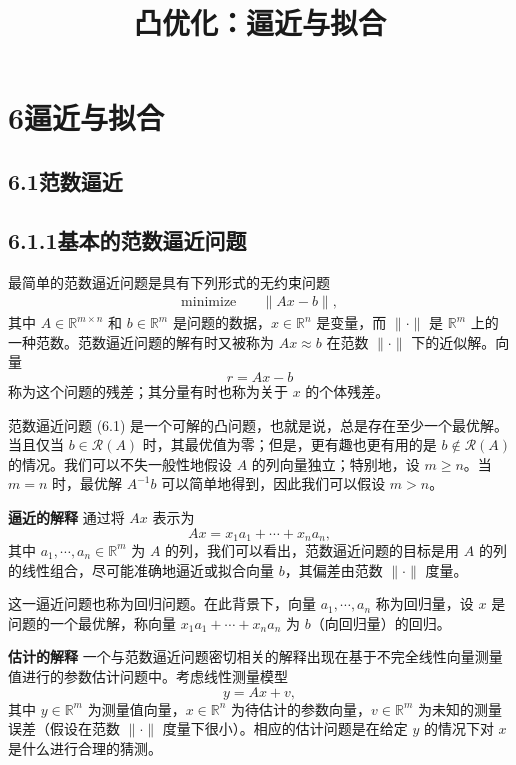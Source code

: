 \documentclass[UTF8, 12pt, fontset=fandol, oneside]{ctexart}
\title{凸优化：逼近与拟合}
\author{}
\date{}
\begin{document}
\maketitle

\section*{6\quad 逼近与拟合}

\subsection*{6.1\quad 范数逼近}

\subsection*{6.1.1\quad 基本的范数逼近问题}

最简单的范数逼近问题是具有下列形式的无约束问题
\begin{equation}
\begin{aligned}
\text{minimize}\quad & \|Ax-b\|,
\end{aligned}
\tag{6.1}
\end{equation}
其中 $A\in\mathbb{R}^{m\times n}$ 和 $b\in\mathbb{R}^m$ 是问题的数据，$x\in\mathbb{R}^n$ 是变量，而 $\|\cdot\|$ 是 $\mathbb{R}^m$ 上的一种范数。范数逼近问题的解有时又被称为 $Ax\approx b$ 在范数 $\|\cdot\|$ 下的近似解。向量
\[
r=Ax-b
\]
称为这个问题的残差；其分量有时也称为关于 $x$ 的个体残差。

范数逼近问题 (6.1) 是一个可解的凸问题，也就是说，总是存在至少一个最优解。当且仅当 $b\in\mathcal{R}(A)$ 时，其最优值为零；但是，更有趣也更有用的是 $b\notin\mathcal{R}(A)$ 的情况。我们可以不失一般性地假设 $A$ 的列向量独立；特别地，设 $m\geq n$。当 $m=n$ 时，最优解 $A^{-1}b$ 可以简单地得到，因此我们可以假设 $m>n$。

\noindent\textbf{逼近的解释}\quad
通过将 $Ax$ 表示为
\[
Ax=x_1a_1+\cdots+x_na_n,
\]
其中 $a_1,\cdots,a_n\in\mathbb{R}^m$ 为 $A$ 的列，我们可以看出，范数逼近问题的目标是用 $A$ 的列的线性组合，尽可能准确地逼近或拟合向量 $b$，其偏差由范数 $\|\cdot\|$ 度量。

这一逼近问题也称为回归问题。在此背景下，向量 $a_1,\cdots,a_n$ 称为回归量，设 $x$ 是问题的一个最优解，称向量 $x_1a_1+\cdots+x_na_n$ 为 $b$（向回归量）的回归。

\noindent\textbf{估计的解释}\quad
一个与范数逼近问题密切相关的解释出现在基于不完全线性向量测量值进行的参数估计问题中。考虑线性测量模型
\[
y=Ax+v,
\]
其中 $y\in\mathbb{R}^m$ 为测量值向量，$x\in\mathbb{R}^n$ 为待估计的参数向量，$v\in\mathbb{R}^m$ 为未知的测量误差（假设在范数 $\|\cdot\|$ 度量下很小）。相应的估计问题是在给定 $y$ 的情况下对 $x$ 是什么进行合理的猜测。
\end{document}
